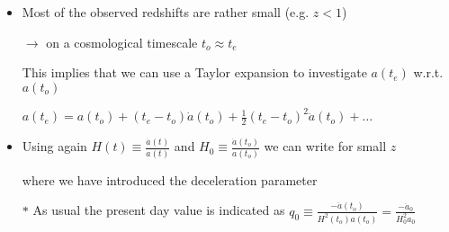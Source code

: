 \Tr
\begin{itemize}
\item Most of the observed redshifts are rather small (e.g. $z<1$)
\item[] $\rightarrow$ on a cosmological timescale $t_{o} \approx t_{e}$
\item[] This implies that we can use a Taylor expansion to investigate $a(t_{e})$ w.r.t. $a(t_{o})$
\item[] $a(t_{e})=a(t_{o})+(t_{e}-t_{o})\dot{a}(t_{o})+\frac{1}{2}(t_{e}-t_{o})^{2}\ddot{a}(t_{o})+\ldots$
\item Using again {\blue $\displaystyle H(t) \equiv \frac{\dot{a}(t)}{a(t)}$} and
      {\blue $\displaystyle H_{0} \equiv \frac{\dot{a}(t_{o})}{a(t_{o})}$} we can write {\red for small $z$}
\item[] \begin{center}
        {\red {}}
        \end{center}
\item[] where we have introduced the {\blue deceleration parameter}
\item[] \begin{center}
        {\red {}}
        \end{center}
\item[$\ast$] As usual the present day value is indicated as
        $\displaystyle q_{0} \equiv \frac{-\ddot{a}(t_{o})}{H^{2}(t_{o})a(t_{o})}=
        \frac{-\ddot{a}_{0}}{H_{0}^{2}a_{0}}$
\end{itemize}

